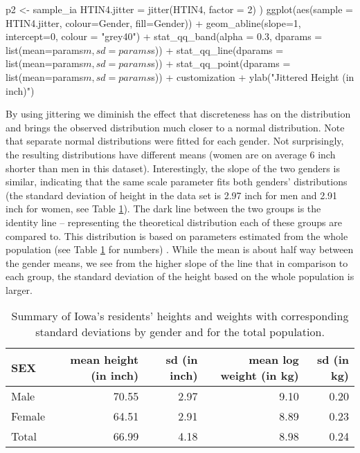 \begin{Schunk}
\begin{Sinput}
p2 <- sample_ia %>% mutate(
    HTIN4.jitter = jitter(HTIN4, factor = 2)
    ) %>% 
  ggplot(aes(sample = HTIN4.jitter, colour=Gender, fill=Gender)) + 
  geom_abline(slope=1, intercept=0, colour = "grey40") +
  stat_qq_band(alpha = 0.3, dparams = list(mean=params$m, sd=params$s)) +
  stat_qq_line(dparams = list(mean=params$m, sd=params$s)) + 
  stat_qq_point(dparams = list(mean=params$m, sd=params$s)) +
  customization +
  ylab("Jittered Height (in inch)") 
\end{Sinput}
\end{Schunk}

By using jittering we diminish the effect that discreteness has on the
distribution and brings the observed distribution much closer to a
normal distribution. Note that separate normal distributions were fitted
for each gender. Not surprisingly, the resulting distributions have
different means (women are on average 6 inch shorter than men in this
dataset). Interestingly, the slope of the two genders is similar,
indicating that the same scale parameter fits both genders'
distributions (the standard deviation of height in the data set is 2.97
inch for men and 2.91 inch for women, see Table \ref{tab:heights}). The
dark line between the two groups is the identity line -- representing
the theoretical distribution each of these groups are compared to. This
distribution is based on parameters estimated from the whole population
(see Table \ref{tab:heights} for numbers) . While the mean is about half
way between the gender means, we see from the higher slope of the line
that in comparison to each group, the standard deviation of the height
based on the whole population is larger.

\begin{table}

\caption{\label{tab:heights-table}Summary of Iowa's residents' heights and weights with corresponding standard deviations by gender and for the total population.\label{tab:heights}}
\centering
\begin{tabular}[t]{lrrrr}
\toprule
SEX & mean height (in inch) & sd (in inch) & mean log weight (in kg) & sd (in kg)\\
\midrule
Male & 70.55 & 2.97 & 9.10 & 0.20\\
Female & 64.51 & 2.91 & 8.89 & 0.23\\
Total & 66.99 & 4.18 & 8.98 & 0.24\\
\bottomrule
\end{tabular}
\end{table}


